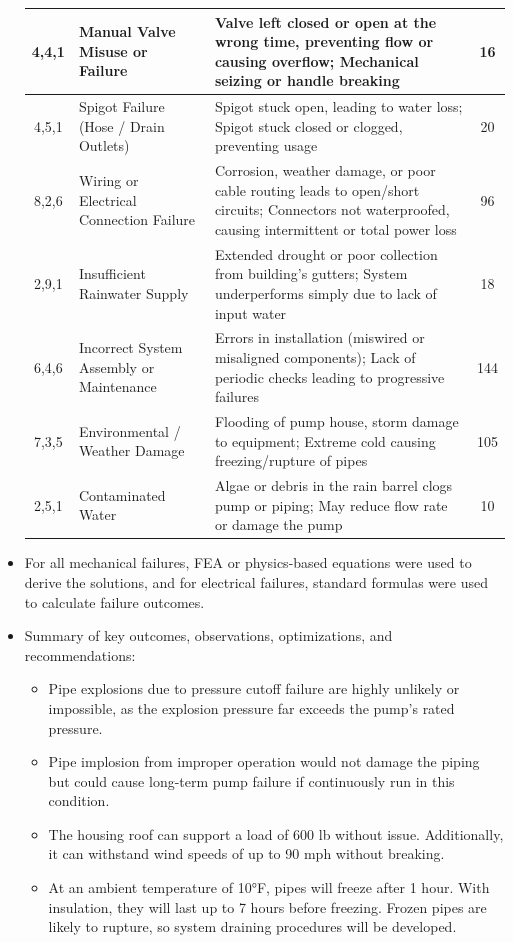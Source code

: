\documentclass[12pt]{article}
\begin{document}
\begin{itemize}
\begin{longtable}{|c|p{4cm}|p{8cm}|c|}
\hline
4,4,1 & Manual Valve Misuse or Failure & Valve left closed or open at the wrong time, preventing flow or causing overflow; Mechanical seizing or handle breaking & 16 \\
\hline
4,5,1 & Spigot Failure (Hose / Drain Outlets) & Spigot stuck open, leading to water loss; Spigot stuck closed or clogged, preventing usage & 20 \\
\hline
8,2,6 & Wiring or Electrical Connection Failure & Corrosion, weather damage, or poor cable routing leads to open/short circuits; Connectors not waterproofed, causing intermittent or total power loss & 96 \\
\hline
2,9,1 & Insufficient Rainwater Supply & Extended drought or poor collection from building’s gutters; System underperforms simply due to lack of input water & 18 \\
\hline
6,4,6 & Incorrect System Assembly or Maintenance & Errors in installation (miswired or misaligned components); Lack of periodic checks leading to progressive failures & 144 \\
\hline
7,3,5 & Environmental / Weather Damage & Flooding of pump house, storm damage to equipment; Extreme cold causing freezing/rupture of pipes & 105 \\
\hline
2,5,1 & Contaminated Water & Algae or debris in the rain barrel clogs pump or piping; May reduce flow rate or damage the pump & 10 \\
\hline
\end{longtable}
    
    \item For all mechanical failures, FEA or physics-based equations were used to derive the solutions, and for electrical failures, standard formulas were used to calculate failure outcomes.
\item Summary of key outcomes, observations, optimizations, and recommendations:
    \begin{itemize}
        \item Pipe explosions due to pressure cutoff failure are highly unlikely or impossible, as the explosion pressure far exceeds the pump’s rated pressure.
        \item Pipe implosion from improper operation would not damage the piping but could cause long-term pump failure if continuously run in this condition.
        \item The housing roof can support a load of 600 lb without issue. Additionally, it can withstand wind speeds of up to 90 mph without breaking.
        \item At an ambient temperature of 10°F, pipes will freeze after 1 hour. With insulation, they will last up to 7 hours before freezing. Frozen pipes are likely to rupture, so system draining procedures will be developed.
    \end{itemize}


\end{itemize}
\end{document}
